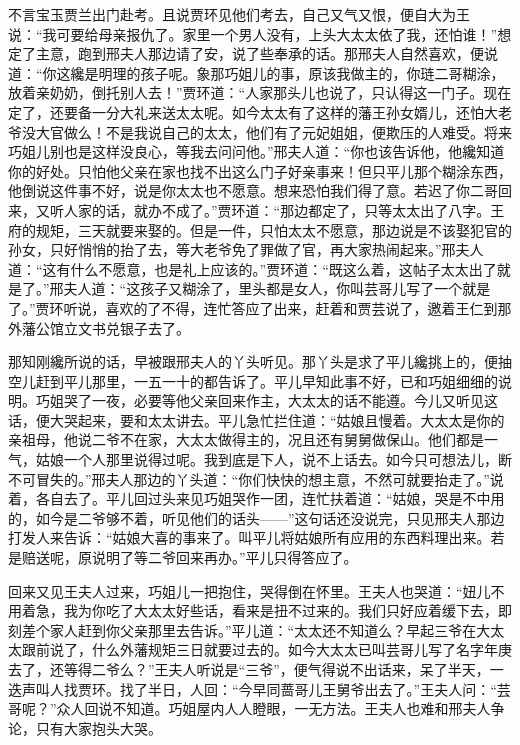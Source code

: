 \begin{parag}
    不言宝玉贾兰出门赴考。且说贾环见他们考去，自己又气又恨，便自大为王说：“我可要给母亲报仇了。家里一个男人没有，上头大太太依了我，还怕谁！”想定了主意，跑到邢夫人那边请了安，说了些奉承的话。那邢夫人自然喜欢，便说道：“你这纔是明理的孩子呢。象那巧姐儿的事，原该我做主的，你琏二哥糊涂，放着亲奶奶，倒托别人去！”贾环道：“人家那头儿也说了，只认得这一门子。现在定了，还要备一分大礼来送太太呢。如今太太有了这样的藩王孙女婿儿，还怕大老爷没大官做么！不是我说自己的太太，他们有了元妃姐姐，便欺压的人难受。将来巧姐儿别也是这样没良心，等我去问问他。”邢夫人道：“你也该告诉他，他纔知道你的好处。只怕他父亲在家也找不出这么门子好亲事来！但只平儿那个糊涂东西，他倒说这件事不好，说是你太太也不愿意。想来恐怕我们得了意。若迟了你二哥回来，又听人家的话，就办不成了。”贾环道：“那边都定了，只等太太出了八字。王府的规矩，三天就要来娶的。但是一件，只怕太太不愿意，那边说是不该娶犯官的孙女，只好悄悄的抬了去，等大老爷免了罪做了官，再大家热闹起来。”邢夫人道：“这有什么不愿意，也是礼上应该的。”贾环道：“既这么着，这帖子太太出了就是了。”邢夫人道：“这孩子又糊涂了，里头都是女人，你叫芸哥儿写了一个就是了。”贾环听说，喜欢的了不得，连忙答应了出来，赶着和贾芸说了，邀着王仁到那外藩公馆立文书兑银子去了。
\end{parag}


\begin{parag}
    那知刚纔所说的话，早被跟邢夫人的丫头听见。那丫头是求了平儿纔挑上的，便抽空儿赶到平儿那里，一五一十的都告诉了。平儿早知此事不好，已和巧姐细细的说明。巧姐哭了一夜，必要等他父亲回来作主，大太太的话不能遵。今儿又听见这话，便大哭起来，要和太太讲去。平儿急忙拦住道：“姑娘且慢着。大太太是你的亲祖母，他说二爷不在家，大太太做得主的，况且还有舅舅做保山。他们都是一气，姑娘一个人那里说得过呢。我到底是下人，说不上话去。如今只可想法儿，断不可冒失的。”邢夫人那边的丫头道：“你们快快的想主意，不然可就要抬走了。”说着，各自去了。平儿回过头来见巧姐哭作一团，连忙扶着道：“姑娘，哭是不中用的，如今是二爷够不着，听见他们的话头——”这句话还没说完，只见邢夫人那边打发人来告诉：“姑娘大喜的事来了。叫平儿将姑娘所有应用的东西料理出来。若是赔送呢，原说明了等二爷回来再办。”平儿只得答应了。
\end{parag}


\begin{parag}
    回来又见王夫人过来，巧姐儿一把抱住，哭得倒在怀里。王夫人也哭道：“妞儿不用着急，我为你吃了大太太好些话，看来是扭不过来的。我们只好应着缓下去，即刻差个家人赶到你父亲那里去告诉。”平儿道：“太太还不知道么？早起三爷在大太太跟前说了，什么外藩规矩三日就要过去的。如今大太太已叫芸哥儿写了名字年庚去了，还等得二爷么？”王夫人听说是“三爷”，便气得说不出话来，呆了半天，一迭声叫人找贾环。找了半日，人回：“今早同蔷哥儿王舅爷出去了。”王夫人问：“芸哥呢？”众人回说不知道。巧姐屋内人人瞪眼，一无方法。王夫人也难和邢夫人争论，只有大家抱头大哭。
\end{parag}


